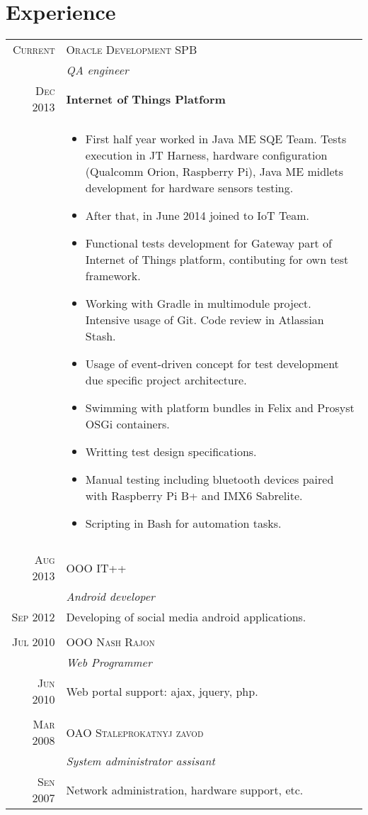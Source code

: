 \documentclass[a4paper,10pt]{article}
\begin{document}
\section{Experience}
	\begin{tabular}{r|p{11cm}}
	  \textsc{Current} & \textsc{Oracle Development SPB} \\ & \emph{QA engineer} \\
	  \textsc{Dec 2013}&\textbf{Internet of Things Platform}\\&
	  \begin{itemize}
	  	\item First half year worked in Java ME SQE Team. Tests execution in JT Harness, hardware configuration (Qualcomm Orion, Raspberry Pi), Java ME midlets development for hardware sensors testing.
		\item After that, in June 2014 joined to IoT Team.
		\item Functional tests development for Gateway part of Internet of Things platform, contibuting for own test framework.
		\item Working with Gradle in multimodule project. Intensive usage of Git. Code review in Atlassian Stash.
		\item Usage of event-driven concept for test development due specific project architecture.
		\item Swimming with platform bundles in Felix and Prosyst OSGi containers.
		\item Writting test design specifications.
		\item Manual testing including bluetooth devices paired with Raspberry Pi B+ and IMX6 Sabrelite.
		\item Scripting in  Bash for automation tasks.
	\end{itemize}
	  \\
	    \multicolumn{2}{c}{} \\
		\textsc{Aug 2013}& \textsc{OOO IT++}\\&\emph{Android developer} \\
		\textsc{Sep 2012}& Developing of social media android applications.\\
		  \multicolumn{2}{c}{} \\
		\textsc{Jul 2010} & 	\textsc{OOO Nash Rajon}\\&\emph{Web Programmer} \\
		\textsc{Jun 2010}& Web portal support: ajax, jquery, php.\\
		  \multicolumn{2}{c}{} \\
		\textsc{Mar 2008} & 	\textsc{OAO Staleprokatnyj zavod}\\&\emph{System administrator assisant}\\
		\textsc{Sen 2007}& Network administration, hardware support, etc.
		\end{tabular}
\end{document}
